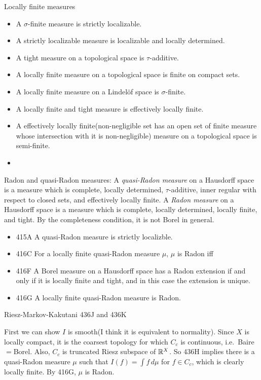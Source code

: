 \documentclass{../../large}
\begin{document}
Locally finite measures
\begin{itemize}
\item A $\sigma$-finite measure is strictly localizable.
\item A strictly localizable measure is localizable and locally determined.
\item A tight measure on a topological space is $\tau$-additive.
\item A locally finite measure on a topological space is finite on compact sets.
\item A locally finite measure on a Lindel\"of space is $\sigma$-finite.
\item A locally finite and tight measure is effectively locally finite.
\item A effectively locally finite(non-negligible set has an open set of finite measure whose intersection with it is non-negligible) measure on a topological space is semi-finite.
\item
\end{itemize}


Radon and quasi-Radon measures:
A \emph{quasi-Radon measure} on a Hausdorff space is a measure which is complete, locally determined, $\tau$-additive, inner regular with respect to closed sets, and effectively locally finite.
A \emph{Radon measure} on a Hausdorff space is a measure which is complete, locally determined, locally finite, and tight.
By the completeness condition, it is not Borel in general.
\begin{itemize}
\item 415A A quasi-Radon measure is strictly localizble.
\item 416C For a locally finite quasi-Radon measure $\mu$, $\mu$ is Radon iff 
\item 416F A Borel measure on a Hausdorff space has a Radon extension if and only if it is locally finite and tight, and in this case the extension is unique.
\item 416G A locally finite quasi-Radon measure is Radon.
\end{itemize}




Riesz-Markov-Kakutani 436J and 436K
\begin{pf}
First we can show $I$ is smooth(I think it is equivalent to normality).
Since $X$ is locally compact, it is the coarsest topology for which $C_c$ is continuous, i.e.~Baire$=$Borel.
Also, $C_c$ is truncated Riesz subspace of $\mathbb{R}^X$.
So 436H implies there is a quasi-Radon measure $\mu$ such that $I(f)=\int f\,d\mu$ for $f\in C_c$, which is clearly locally finite.
By 416G, $\mu$ is Radon.
\end{pf}
\end{document}

